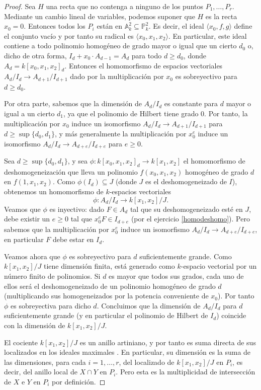 \documentclass[a4paper,10pt]{book}
\newcommand{\AAA}{\mathbb A}
\newcommand{\PP}{\mathbb P}
\begin{document}
\begin{proof}
 Sea $H$ una recta que no contenga a ninguno de los puntos $P_1,\ldots,P_r$. Mediante un cambio lineal de variables, podemos suponer que $H$ es la recta $x_0=0$. Entonces todos los $P_i$ están en $\AAA^2_k\subseteq\PP^2_k$. Es decir, el ideal $\langle x_0,f,g \rangle$ define el conjunto vacío y por tanto su radical es $\langle x_0,x_1,x_2\rangle$. En particular, este ideal contiene a todo polinomio homogéneo de grado mayor o igual que un cierto $d_0$ o, dicho de otra forma, $I_d+x_0\cdot A_{d-1}=A_d$ para todo $d\geq d_0$, donde $A_d=k[x_0,x_1,x_2]_d$. Entonces el homomorfismo de espacios vectoriales $A_{d}/I_{d}\to A_{d+1}/I_{d+1}$ dado por la multiplicación por $x_0$ es sobreyectivo para $d\geq d_0$.

Por otra parte, sabemos que la dimensión de $A_d/I_d$ es constante para $d$ mayor o igual a un cierto $d_1$, ya que el polinomio de Hilbert tiene grado $0$. Por tanto, la multiplicación por $x_0$ induce un isomorfismo $A_{d}/I_{d}\to A_{d+1}/I_{d+1}$ para $d\geq\sup\{d_0,d_1\}$, y más generalmente la multiplicación por $x_0^e$ induce un isomorfismo $A_d/I_d\to A_{d+e}/I_{d+e}$ para $e\geq 0$.

Sea $d\geq\sup\{d_0,d_1\}$, y sea $\phi:k[x_0,x_1,x_2]_d\to k[x_1,x_2]$ el homomorfismo de deshomogeneización que lleva un polinomio $f(x_0,x_1,x_2)$ homogéneo de grado $d$ en $f(1,x_1,x_2)$. Como $\phi(I_d)\subseteq J$ (donde $J$ es el deshomogeneizado de $I$), obtenemos un homomorfismo de $k$-espacios vectoriales
$$
\phi:A_d/I_d\to k[x_1,x_2]/J.
$$
Veamos que $\phi$ es inyectivo: dado $F\in A_d$ tal que su deshomogeneizado esté en $J$, debe existir un $e\geq 0$ tal que $x_0^eF\in I_{d+e}$ (por el ejercicio \ref{homodeshomo}). Pero sabemos que la multiplicación por $x_0^e$ induce un isomorfismo $A_d/I_d\to A_{d+e}/I_{d+e}$, en particular $F$ debe estar en $I_d$.

Veamos ahora que $\phi$ es sobreyectivo para $d$ suficientemente grande. Como $k[x_1,x_2]/J$ tiene dimensión finita, está generado como $k$-espacio vectorial por un número finito de polinomios. Si $d$ es mayor que todos sus grados, cada uno de ellos será el deshomogeneizado de un polinomio homogéneo de grado $d$ (multiplicando sus homogeneizados por la potencia conveniente de $x_0$). Por tanto $\phi$ es sobreyectiva para dicho $d$. Concluimos que la dimensión de $A_d/I_d$ para $d$ suficientemente grande (y en particular el polinomio de Hilbert de $I_d$) coincide con la dimensión de $k[x_1,x_2]/J$.

El cociente $k[x_1,x_2]/J$ es un anillo artiniano, y por tanto es suma directa de sus localizados en los ideales maximales \cite[Teorema 8.7]{am}. En particular, su dimensión es la suma de las dimensiones, para cada $i=1,\ldots,r$, del localizado de $k[x_1,x_2]/J$ en $P_i$, es decir, del anillo local de $X\cap Y$ en $P_i$. Pero esta es la multiplicidad de intersección de $X$ e $Y$ en $P_i$ por definición.\end{proof}
\end{document}

